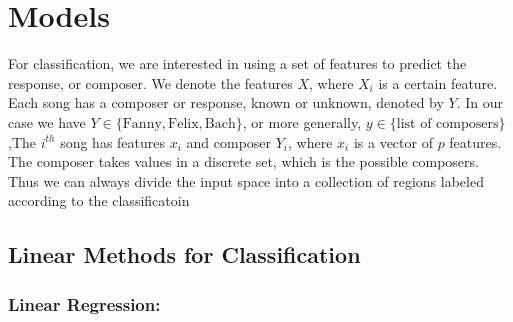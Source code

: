 \documentclass[12pt,twoside]{reedthesis}
\theoremstyle{definition}
\theoremstyle{definition}
\theoremstyle{definition}
\theoremstyle{remark}
\begin{document}
\begin{Shaded}
\begin{Highlighting}[]

\StringTok{ }\NormalTok{(featuresm[,}\OperatorTok{-}\NormalTok{], }
 \NormalTok{)}

\StringTok{ }\NormalTok{(} \OperatorTok{:}\NormalTok{,}
                \OperatorTok{$}\OperatorTok{^} \OperatorTok{/}\StringTok{ }\OperatorTok{$}\OperatorTok{^}\NormalTok{))}
\NormalTok{(}\OperatorTok{+}
\StringTok{  }\NormalTok{() }\OperatorTok{+}\StringTok{ }
\StringTok{  }\NormalTok{()}
\end{Highlighting}
\end{Shaded}
\chapter{Models}\label{models}

For classification, we are interested in using a set of features to
predict the response, or composer. We denote the features \(X\), where
\(X_i\) is a certain feature. Each song has a composer or response,
known or unknown, denoted by \(Y\). In our case we have
\(Y \in \{\text{Fanny},\text{Felix}, \text{Bach}\}\), or more generally,
\(y \in \{\text{list of composers}\}\),The \(i^{th}\) song has features
\(x_i\) and composer \(Y_i\), where \(x_i\) is a vector of \(p\)
features. The composer takes values in a discrete set, which is the
possible composers. Thus we can always divide the input space into a
collection of regions labeled according to the classificatoin

\section{Linear Methods for
Classification}\label{linear-methods-for-classification}

\subsection{Linear Regression:}\label{linear-regression}
\end{document}
